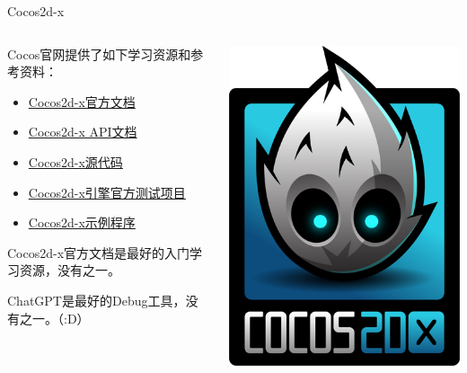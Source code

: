 \documentclass{beamer}
\newcommand{\hrefcol}[2]{\textcolor{cyan}{\href{#1}{#2}}}
\begin{document}

\begin{frame}[fragile]{Cocos2d-x}
\begin{columns}
\begin{column}{0.7\textwidth}
Cocos官网提供了如下学习资源和参考资料：
\begin{itemize}
\item \hrefcol{https://docs.cocos.com/cocos2d-x/manual/zh}{Cocos2d-x官方文档}
\item \hrefcol{https://docs.cocos2d-x.org/api-ref}{Cocos2d-x API文档}
\item \hrefcol{https://github.com/cocos2d/cocos2d-x}{Cocos2d-x源代码}
\item \hrefcol{https://github.com/cocos2d/cocos2d-x/tree/v3/tests}{Cocos2d-x引擎官方测试项目}
\item \hrefcol{https://github.com/cocos2d/cocos2d-x-samples}{Cocos2d-x示例程序}
\end{itemize}

\vspace{1em}

Cocos2d-x官方文档是最好的入门学习资源，没有之一。

ChatGPT是最好的Debug工具，没有之一。（:D）
\end{column}
\begin{column}{0.3\textwidth}
\includegraphics[width=\textwidth]
{figures/cocos2dx}
\end{column}
\end{columns}
\end{frame}
\end{document}
